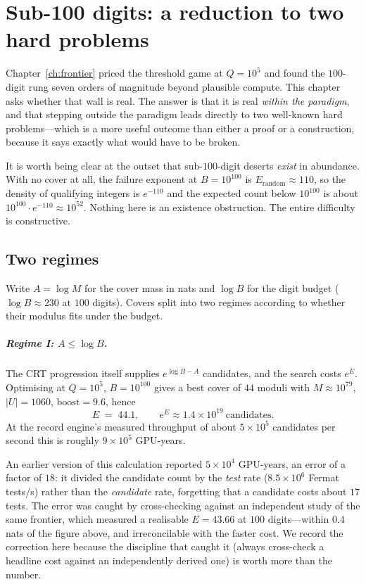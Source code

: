 \chapter{Sub-100 digits: a reduction to two hard problems}\label{ch:barriers}

Chapter~\ref{ch:frontier} priced the threshold game at $Q=10^{5}$ and found the
$100$-digit rung seven orders of magnitude beyond plausible compute. This
chapter asks whether that wall is real. The answer is that it is real
\emph{within the paradigm}, and that stepping outside the paradigm leads
directly to two well-known hard problems---which is a more useful outcome than
either a proof or a construction, because it says exactly what would have to be
broken.

It is worth being clear at the outset that sub-$100$-digit deserts \emph{exist}
in abundance. With no cover at all, the failure exponent at $B=10^{100}$ is
$E_{\text{random}}\approx110$, so the density of qualifying integers is
$e^{-110}$ and the expected count below $10^{100}$ is about
$10^{100}\cdot e^{-110}\approx10^{52}$. Nothing here is an existence
obstruction. The entire difficulty is constructive.

\section{Two regimes}

Write $A=\log M$ for the cover mass in nats and $\log B$ for the digit budget
($\log B\approx230$ at $100$ digits). Covers split into two regimes according to
whether their modulus fits under the budget.

\paragraph{Regime I: $A\le\log B$.} The CRT progression itself supplies
$e^{\log B-A}$ candidates, and the search costs $e^{E}$. Optimising at
$Q=10^{5}$, $B=10^{100}$ gives a best cover of $44$ moduli with
$M\approx10^{79}$, $|U|=1060$, $\mathrm{boost}=9.6$, hence
\[
E\;=\;44.1,\qquad e^{E}\approx1.4\times10^{19}\ \text{candidates}.
\]
At the record engine's measured throughput of about $5\times10^{5}$ candidates
per second this is roughly $9\times10^{5}$ GPU-years.

\begin{remark}\label{rem:units}
An earlier version of this calculation reported $5\times10^{4}$ GPU-years, an
error of a factor of $18$: it divided the candidate count by the \emph{test}
rate ($8.5\times10^{6}$ Fermat tests/s) rather than the \emph{candidate} rate,
forgetting that a candidate costs about $17$ tests. The error was caught by
cross-checking against an independent study of the same frontier, which measured
a realisable $E=43.66$ at $100$ digits---within $0.4$ nats of the figure above,
and irreconcilable with the faster cost. We record the correction here because
the discipline that caught it (always cross-check a headline cost against an
independently derived one) is worth more than the number.
\end{remark}

